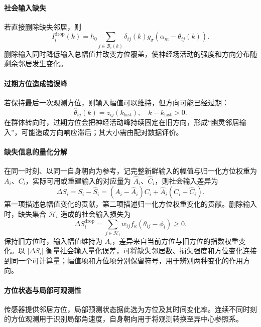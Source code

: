 \documentclass[UTF8,fontset=windows,11pt]{ctexart}
\begin{document}
\paragraph{社会输入缺失}
若直接删除缺失邻居，则
\begin{equation}
 I_i^{\mathrm{drop}}(k)=
 h_0\sum_{j\in\mathcal B_i(k)}\delta_{ij}(k)
 g_\sigma(\alpha_m-\theta_{ij}(k)).
\end{equation}
删除输入同时降低输入总幅值并改变方位覆盖，使神经场活动的强度和方向分布随剩余邻居发生变化。

\paragraph{过期方位造成错误峰}
若保持最后一次观测方位，则输入幅值可以维持，但方向可能已经过期：
\begin{equation}
 \hat\theta_{ij}(k)=z_{ij}(k_{\mathrm{last}}),
\quad k-k_{\mathrm{last}}>0.
\end{equation}
在群体转向时，过期方位会把神经活动峰持续固定在旧方向，形成“幽灵邻居输入”，可能造成方向响应滞后；其大小需由配对数据评价。

\paragraph{缺失信息的量化分解}

在同一时刻、以同一自身朝向为参考，记完整新鲜输入的幅值与归一化方位权重为 $A_i$、$C_i$，实际可用或重建输入的对应量为 $\widehat A_i$、$\widehat C_i$，则社会输入差异为
\begin{equation}
 \Delta S_i=S_i-\widehat S_i
 =(A_i-\widehat A_i)C_i
 +\widehat A_i(C_i-\widehat C_i).
 \label{eq:missing_input_decomposition}
\end{equation}
第一项描述总幅值变化的贡献，第二项描述归一化方位权重变化的贡献。删除输入时，缺失集合 $\mathcal H_i$ 造成的社会输入损失为
\begin{equation}
 \Delta S_i^{\mathrm{drop}}=
 \sum_{j\in\mathcal H_i}w_{ij}f_\kappa(\theta_{ij}-\phi_i)\geq0.
\end{equation}
保持旧方位时，输入幅值维持为 $A_i$，差异来自当前方位与旧方位的指数权重变化。以 $|\Delta S_i|$ 衡量社会输入量化误差，可将缺失邻居数、损失强度和方位变化连接到同一个可计算量；幅值项和方位项分别保留符号，用于辨别两种变化的作用方向。

\paragraph{方位状态与局部可观测性}
传感器提供邻居方位，局部预测状态据此选为方位及其时间变化率。连续不同时刻的方位观测用于识别局部角速度，自身朝向用于将观测转换至异中心参照系。
\end{document}
